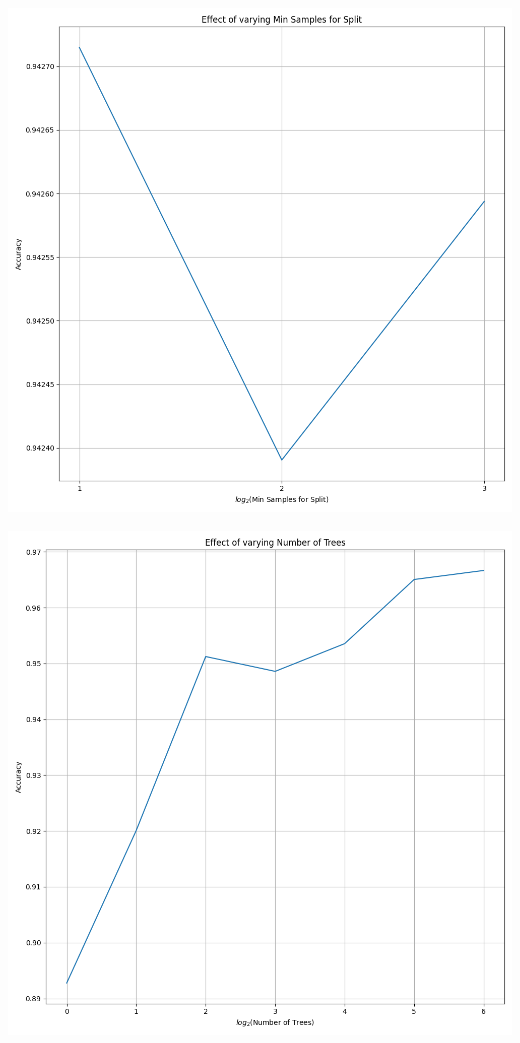 \documentclass[12pt, letterpaper]{article}
\begin{document}
\includegraphics[scale=\myscale]{random_forest_classifier_Min Samples for Split.png}

\includegraphics[scale=\myscale]{random_forest_classifier_Number of Trees.png}
\end{document}
